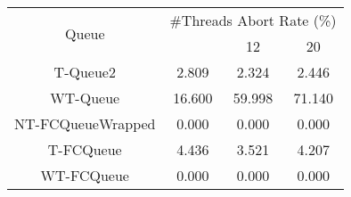 \begin{tabular}{|c|c|c|c|}
\hline
\multirow{2}{*}{Queue} & \multicolumn{3}{c|}{\#Threads Abort Rate (\%)}\\\cline{2-4}& \quad 4 & 12 & 20\\
\hline
\hline
T-Queue2 & 2.809 & 2.324 & 2.446\\
WT-Queue & 16.600 & 59.998 & 71.140\\
NT-FCQueueWrapped & 0.000 & 0.000 & 0.000\\
T-FCQueue & 4.436 & 3.521 & 4.207\\
WT-FCQueue & 0.000 & 0.000 & 0.000\\
\hline\end{tabular}
